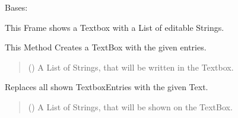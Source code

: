 \documentclass[letterpaper,10pt,english]{sphinxmanual}
\begin{document}
\begin{fulllineitems}
\label{\detokenize{apidoc/src.osm_configurator.view.utilityframes:src.osm_configurator.view.utilityframes.tag_list_frame.TagListFrame}}
\pysigstartsignatures
{}
\pysigstopsignatures
\sphinxAtStartPar
Bases: 

\sphinxAtStartPar
This Frame shows a Textbox with a List of editable Strings.

\begin{fulllineitems}
\label{\detokenize{apidoc/src.osm_configurator.view.utilityframes:src.osm_configurator.view.utilityframes.tag_list_frame.TagListFrame.__init__}}
\pysigstartsignatures
{}
\pysigstopsignatures
\sphinxAtStartPar
This Method Creates a TextBox with the given entries.
\begin{quote}\begin{description}
\sphinxAtStartPar
{}\sphinxstyleliteralstrong{\sphinxupquote{{[}}}\sphinxstyleliteralstrong{\sphinxupquote{{]}}} () \textendash{} A List of Strings, that will be written in the Textbox.

\end{description}\end{quote}

\end{fulllineitems}


\begin{fulllineitems}
\label{\detokenize{apidoc/src.osm_configurator.view.utilityframes:src.osm_configurator.view.utilityframes.tag_list_frame.TagListFrame.set_text_list}}
\pysigstartsignatures
{}
\pysigstopsignatures
\sphinxAtStartPar
Replaces all shown Textbox\sphinxhyphen{}Entries with the given Text.
\begin{quote}\begin{description}
\sphinxAtStartPar
{}\sphinxstyleliteralstrong{\sphinxupquote{{[}}}\sphinxstyleliteralstrong{\sphinxupquote{{]}}} () \textendash{} A List of Strings, that will be shown on the TextBox.


\end{description}
\end{quote}
\end{fulllineitems}
\end{fulllineitems}
\end{document}
